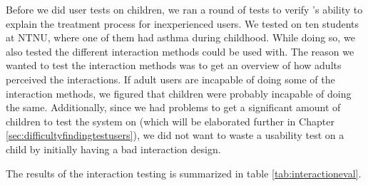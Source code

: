 Before we did user tests on children, we ran a round of tests to verify \ab{}'s ability to explain the treatment process for inexperienced users. We tested on ten students at NTNU, where one of them had asthma during childhood. While doing so, we also tested the different interaction methods \ab{} could be used with. The reason we wanted to test the interaction methods was to get an overview of how adults perceived the interactions. If adult users are incapable of doing some of the interaction methods, we figured that children were probably incapable of doing the same. Additionally, since we had problems to get a significant amount of children to test the system on (which will be elaborated further in Chapter \ref{sec:difficultyfindingtestusers}), we did not want to waste a usability test on a child by initially having a bad interaction design.         

The results of the interaction testing is summarized in table \ref{tab:interactioneval}.  

